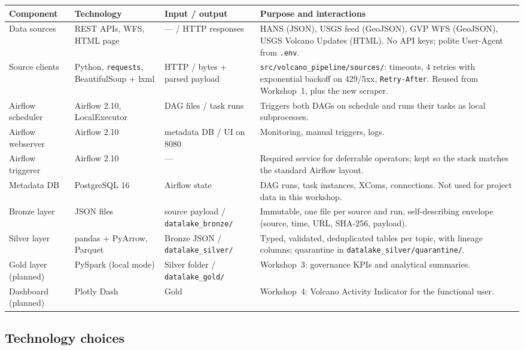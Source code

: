 \documentclass[11pt,a4paper]{article}
\begin{document}
\begin{longtable}{L{2.6cm}L{2.6cm}L{3.6cm}L{5.6cm}}
\toprule
\textbf{Component} & \textbf{Technology} & \textbf{Input / output} & \textbf{Purpose and interactions}\\
\midrule
\endhead
Data sources & REST APIs, WFS, HTML page & --- / HTTP responses & HANS (JSON), USGS feed (GeoJSON), GVP WFS (GeoJSON), USGS Volcano Updates (HTML). No API keys; polite User-Agent from \texttt{.env}.\\
Source clients & Python, \texttt{requests}, BeautifulSoup + lxml & HTTP / bytes + parsed payload & \texttt{src/volcano\_pipeline/sources/}: timeouts, 4 retries with exponential backoff on 429/5xx, \texttt{Retry-After}. Reused from Workshop~1, plus the new scraper.\\
Airflow scheduler & Airflow 2.10, LocalExecutor & DAG files / task runs & Triggers both DAGs on schedule and runs their tasks as local subprocesses.\\
Airflow webserver & Airflow 2.10 & metadata DB / UI on 8080 & Monitoring, manual triggers, logs.\\
Airflow triggerer & Airflow 2.10 & --- & Required service for deferrable operators; kept so the stack matches the standard Airflow layout.\\
Metadata DB & PostgreSQL 16 & Airflow state & DAG runs, task instances, XComs, connections. Not used for project data in this workshop.\\
Bronze layer & JSON files & source payload / \texttt{datalake\_bronze/} & Immutable, one file per source and run, self-describing envelope (source, time, URL, SHA-256, payload).\\
Silver layer & pandas + PyArrow, Parquet & Bronze JSON / \texttt{datalake\_silver/} & Typed, validated, deduplicated tables per topic, with lineage columns; quarantine in \texttt{datalake\_silver/quarantine/}.\\
Gold layer (planned) & PySpark (local mode) & Silver folder / \texttt{datalake\_gold/} & Workshop~3: governance KPIs and analytical summaries.\\
Dashboard (planned) & Plotly Dash & Gold & Workshop~4: Volcano Activity Indicator for the functional user.\\
\bottomrule
\end{longtable}

\subsection{Technology choices}
\end{document}
